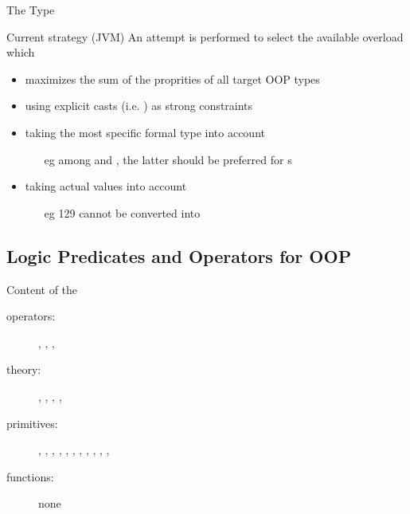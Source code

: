 \documentclass[handout]{beamer}
\begin{document}
\begin{frame}[allowframebreaks]{The  Type}
    \begin{exampleblock}{Current strategy (JVM)}
        An attempt is performed to select the available overload which
        \begin{itemize}
            \item maximizes the sum of the proprities of all target OOP types
            \item using explicit casts (i.e. ) as \alert{strong} constraints
            \item taking the most specific formal type into account
            \begin{itemize}
                \item[eg] among  and , the latter should be preferred for s
            \end{itemize}
            \item taking actual values into account
            \begin{itemize}
                \item[eg] 129 cannot be converted into 
            \end{itemize}
        \end{itemize}
    \end{exampleblock}
\end{frame}

\subsection{Logic Predicates and Operators for OOP}

\begin{frame}{Content of the }

    \vfill
    \begin{description}

        \item[operators:] , , ,  
        
        \vfill
        
        \item[theory:] , , , , 
        
        \vfill
        
        \item[primitives:] , , , , , , , , , , , 
        
        \vfill
        
        \item[functions:] none
    \end{description}
\end{frame}
\end{document}
